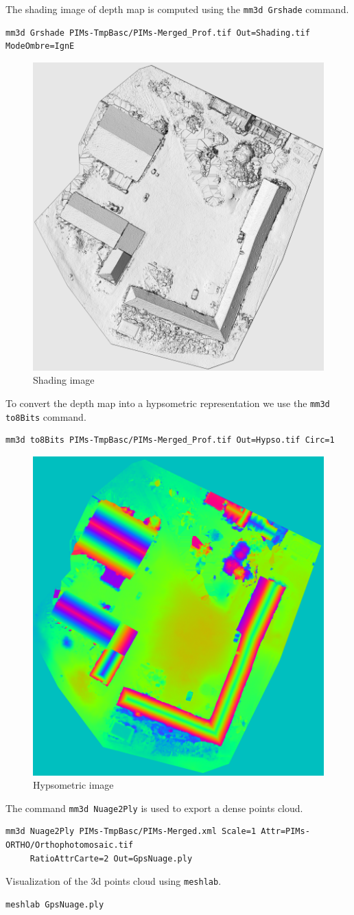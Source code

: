 The shading image of depth map is computed using the {\tt mm3d Grshade} command.
\begin{verbatim}
mm3d Grshade PIMs-TmpBasc/PIMs-Merged_Prof.tif Out=Shading.tif ModeOmbre=IgnE
\end{verbatim}

\begin{figure}[H]
    \begin{center}
    \setlength{\unitlength}{0.5cm}
    \includegraphics[width=0.4\linewidth]{FIGS/Viabon/shading.png}
    \end{center}
    \caption{Shading image}
    \label{fig:sel}
\end{figure}

To convert the depth map into a hypsometric representation we use the {\tt mm3d to8Bits} command.
\begin{verbatim}
mm3d to8Bits PIMs-TmpBasc/PIMs-Merged_Prof.tif Out=Hypso.tif Circ=1
\end{verbatim}

\begin{figure}[H]
    \begin{center}
    \setlength{\unitlength}{0.5cm}
    \includegraphics[width=0.4\linewidth]{FIGS/Viabon/hypso.png}
    \end{center}
    \caption{Hypsometric image}
    \label{fig:sel}
\end{figure}

The command {\tt mm3d Nuage2Ply} is used to export a dense points cloud.
\begin{verbatim}
mm3d Nuage2Ply PIMs-TmpBasc/PIMs-Merged.xml Scale=1 Attr=PIMs-ORTHO/Orthophotomosaic.tif 
     RatioAttrCarte=2 Out=GpsNuage.ply
\end{verbatim}

Visualization of the 3d points cloud using {\tt meshlab}.
\begin{verbatim}
meshlab GpsNuage.ply
\end{verbatim}
